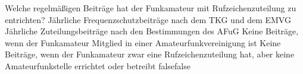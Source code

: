     {Welche regelmäßigen Beiträge hat der Funkamateur mit Rufzeichenzuteilung zu entrichten?}
    {Jährliche Frequenzschutzbeiträge nach dem TKG und dem EMVG}
    {Jährliche Zuteilungsbeiträge nach den Bestimmungen des AFuG}
    {Keine Beiträge, wenn der Funkamateur Mitglied in einer Amateurfunkvereinigung ist}
    {Keine Beiträge, wenn der Funkamateur zwar eine Rufzeichenzuteilung hat, aber keine Amateurfunkstelle errichtet oder betreibt}
    {false}{false}
